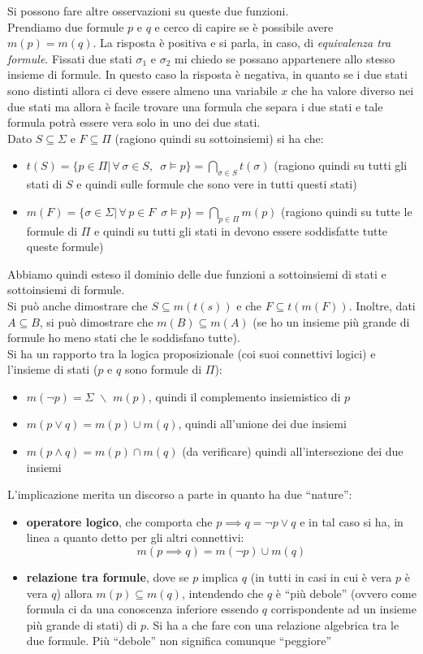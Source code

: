 \documentclass[a4paper,12pt, oneside]{book}
\begin{document}
Si possono fare altre osservazioni su queste due funzioni. \\
Prendiamo due formule $p$ e $q$ e cerco di capire se è possibile avere
$m(p)=m(q)$. La risposta è positiva e si parla, in caso, di \textit{equivalenza
  tra formule}. Fissati due stati $\sigma_1$ e $\sigma_2$ mi chiedo se possano
appartenere allo stesso insieme di formule. In questo caso la risposta è
negativa, in quanto se i due stati sono distinti allora ci deve essere almeno
una variabile $x$ che ha valore diverso nei due stati ma allora è facile trovare
una formula che separa i due stati e tale formula potrà essere vera solo in uno
dei due stati.\\
Dato $S\subseteq \Sigma$ e $F\subseteq\Pi$ (ragiono quindi su sottoinsiemi) si
ha che:
\begin{itemize}
  \item $t(S)=\{p\in \Pi|\,\forall\,\sigma\in S,\,\,\,\sigma\vDash
  p\}=\bigcap_{\sigma\in S}t(\sigma)$ (ragiono quindi su tutti gli stati di $S$
  e quindi sulle formule che sono vere in tutti questi stati) 
  \item $m(F)=\{\sigma\in \Sigma|\,\forall\,p\in F\,\,\,\sigma\vDash
  p\}=\bigcap_{p\in \Pi}m(p)$ (ragiono quindi su tutte le formule di $\Pi$
  e quindi su tutti gli stati in devono essere soddisfatte tutte queste formule) 
\end{itemize}
Abbiamo quindi esteso il dominio delle due funzioni a sottoinsiemi di stati e
sottoinsiemi di formule.\\
Si può anche dimostrare che $S\subseteq m(t(s))$ e che $F\subseteq
t(m(F))$. Inoltre, dati $A\subseteq B$, si può dimostrare che $m(B)\subseteq
m(A)$ (se ho un insieme più grande di formule ho meno stati che le soddisfano
tutte).\\
Si ha un rapporto tra la logica proposizionale (coi suoi connettivi logici) e
l'insieme di stati ($p$ e $q$ sono formule di $\Pi$): 
\begin{itemize}
  \item $m(\neg p)=\Sigma \,\,\backslash \,\,m(p)$, quindi il complemento
  insiemistico di $p$
  \item $m(p\lor q)=m(p)\cup m(q)$, quindi all'unione dei due insiemi  
  \item $m(p\land q)=m(p)\cap m(q)$ (da verificare) quindi all'intersezione dei
  due insiemi
\end{itemize}
L'implicazione merita un discorso a parte in quanto ha due ``nature'':
\begin{itemize}
  \item \textbf{operatore logico}, che comporta che $p\implies q= \neg p\lor q$
  e in tal caso si ha, in linea a quanto detto per gli altri connettivi:
  \[m(p\implies q)= m(\neg p)\cup m(q)\]
  \item \textbf{relazione tra formule}, dove se $p$ implica $q$ (in tutti in
  casi in cui è vera $p$ è vera $q$) allora
  $m(p)\subseteq m(q)$, intendendo che $q$ è ``più debole'' (ovvero come formula
  ci da una conoscenza inferiore essendo $q$ corrispondente ad un insieme più
  grande di stati) di $p$. Si ha a che
  fare con una relazione algebrica tra le due formule. Più ``debole'' non
  significa comunque ``peggiore''
\end{itemize}
\end{document}
